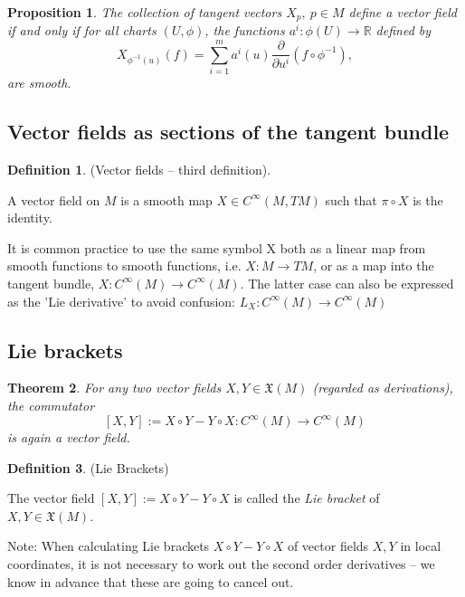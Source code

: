 \documentclass{article}
\newtheorem{theorem}{Theorem}[section]
\newtheorem{proposition}{Proposition}[theorem]
\theoremstyle{definition}
\newtheorem{defn}[theorem]{Definition}
\newenvironment{definition}
  {\vspace{8pt}\begin{mdframed}[backgroundcolor=blueish,innertopmargin=4]\begin{defn}}
  {\end{defn}\end{mdframed}\vspace{4pt}}
\begin{document}
\begin{proposition}

The collection of tangent vectors $X_p,\  p \in M$ define a vector field if and only if for all charts $(U,\phi)$, the functions $a^i : \phi(U) \rightarrow \mathbb R$ defined by 
\[
    X_{\phi^{-1}(u)} (f) = \sum_{i=1}^m a^i (u) \frac{\partial}{\partial u^i} (f \circ \phi^{-1}),
\]
are smooth.

\end{proposition}

\subsection{Vector fields as sections of the tangent bundle}


\begin{definition} (Vector fields – third definition).

A vector field on $M$ is a smooth map $X \in C^\infty(M,TM)$ such that $\pi \circ X$ is the identity.

\end{definition}

It is common practice to use the same symbol X both as a linear map from smooth functions to smooth functions, i.e. $X : M \rightarrow TM$, or as a map into the tangent bundle, $X : C^\infty(M) \rightarrow C^\infty(M)$. The latter case can also be expressed as the 'Lie derivative' to avoid confusion: $L_X : C^\infty(M) \rightarrow C^\infty(M)$

\subsection{Lie brackets}
\begin{theorem}

For any two vector fields $X,Y \in \mathfrak X(M)$ (regarded as derivations), the commutator 
\[
    [X,Y] := X \circ Y - Y \circ X : C^\infty (M) \rightarrow C^\infty (M)
\]
is again a vector field.

\end{theorem}

\begin{definition} (Lie Brackets)

The vector field $[X,Y] := X \circ Y - Y \circ X$ is called the \textit{Lie bracket} of $X,Y \in \mathfrak X(M)$.

\end{definition}

Note: When calculating Lie brackets $X \circ Y - Y \circ X$ of vector fields $X,Y$ in local coordinates, it is not necessary to work out the second order derivatives – we know in advance that these are going to cancel out.
\end{document}
